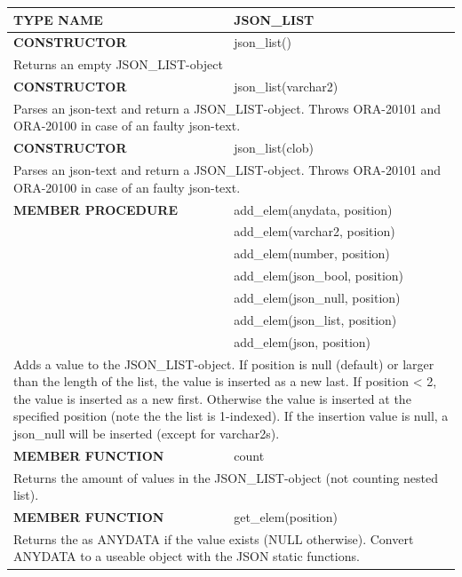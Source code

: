 \documentclass[11pt,twocolumn, a4paper]{article}
\begin{document}
\begin{longtable}{| l | l |}

\hline
  \rowcolor{gray}\color{white}
  \textbf{TYPE NAME} & \color{white}\textbf{JSON\_LIST} \\
\hline

\hline
  \textbf{CONSTRUCTOR} & json\_list()\\
\hline
  \multicolumn{2}{|p{15cm}|}{Returns an empty JSON\_LIST-object} \\
\hline

\hline
  \textbf{CONSTRUCTOR} & json\_list(varchar2)\\
\hline
  \multicolumn{2}{|p{15cm}|}{Parses an json-text and return a JSON\_LIST-object. 
Throws ORA-20101 and ORA-20100 in case of an faulty json-text.} \\
\hline

\hline
  \textbf{CONSTRUCTOR} & json\_list(clob)\\
\hline
  \multicolumn{2}{|p{15cm}|}{Parses an json-text and return a JSON\_LIST-object. 
Throws ORA-20101 and ORA-20100 in case of an faulty json-text.} \\
\hline

\hline
  \textbf{MEMBER PROCEDURE} & add\_elem(anydata, position)\\
& add\_elem(varchar2, position)\\
& add\_elem(number, position)\\
& add\_elem(json\_bool, position)\\
& add\_elem(json\_null, position)\\
& add\_elem(json\_list, position)\\
& add\_elem(json, position)\\
\hline
  \multicolumn{2}{|p{15cm}|}{Adds a value to the JSON\_LIST-object. If position is null (default) or larger than the length of the list, the value is inserted as a new last. If position < 2, the value is inserted as a new first. Otherwise the value is inserted at the specified position (note the the list is 1-indexed). If the insertion value is null, a json\_null will be inserted (except for varchar2s).} \\
\hline

\hline
  \textbf{MEMBER FUNCTION} & count\\
\hline
  \multicolumn{2}{|p{15cm}|}{Returns the amount of values in the JSON\_LIST-object (not counting nested list).} \\
\hline

\hline
  \textbf{MEMBER FUNCTION} & get\_elem(position)\\
\hline
  \multicolumn{2}{|p{15cm}|}{Returns the as ANYDATA if the value exists (NULL otherwise). Convert ANYDATA to a useable object with the JSON static functions.} \\
\hline


\end{longtable}
\end{document}
